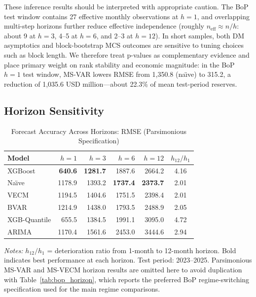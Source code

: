 \documentclass[12pt,a4paper]{article}
\begin{document}
These inference results should be interpreted with appropriate caution. The BoP test window contains 27 effective monthly observations at $h=1$, and overlapping multi-step horizons further reduce effective independence (roughly $n_{\text{eff}} \approx n/h$: about 9 at $h=3$, 4--5 at $h=6$, and 2--3 at $h=12$). In short samples, both DM asymptotics and block-bootstrap MCS outcomes are sensitive to tuning choices such as block length. We therefore treat p-values as complementary evidence and place primary weight on rank stability and economic magnitude: in the BoP $h=1$ test window, MS-VAR lowers RMSE from 1,350.8 (na\"{\i}ve) to 315.2, a reduction of 1,035.6 USD million---about 22.3\% of mean test-period reserves.

\subsection{Horizon Sensitivity}

\begin{table}[htbp]
\centering
\caption{Forecast Accuracy Across Horizons: RMSE (Parsimonious Specification)}
\label{tab:horizon}
\begin{tabular}{lrrrrc}
\toprule
Model & $h = 1$ & $h = 3$ & $h = 6$ & $h = 12$ & $h_{12}/h_1$ \\
\midrule
XGBoost & \textbf{640.6} & \textbf{1281.7} & 1887.6 & 2664.2 & 4.16 \\
Na\"{\i}ve & 1178.9 & 1393.2 & \textbf{1737.4} & \textbf{2373.7} & 2.01 \\
VECM & 1194.5 & 1404.6 & 1751.5 & 2398.4 & 2.01 \\
BVAR & 1214.9 & 1438.0 & 1793.5 & 2488.9 & 2.05 \\
XGB-Quantile & 655.5 & 1384.5 & 1991.1 & 3095.0 & 4.72 \\
ARIMA & 1170.4 & 1561.6 & 2453.0 & 3444.6 & 2.94 \\
\bottomrule
\end{tabular}
\begin{tablenotes}
\small
\item \textit{Notes:} $h_{12}/h_1$ = deterioration ratio from 1-month to 12-month horizon. Bold indicates best performance at each horizon. Test period: 2023--2025. Parsimonious MS-VAR and MS-VECM horizon results are omitted here to avoid duplication with Table~\ref{tab:bop_horizon}, which reports the preferred BoP regime-switching specification used for the main regime comparisons.
\end{tablenotes}
\end{table}
\end{document}
